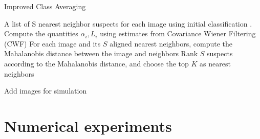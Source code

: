 \documentclass{article}
\begin{document}
\begin{algorithm}
\caption{Improved Class Averaging }
\label{alg:classav}
\begin{algorithmic}[1]
\Require  A list of S nearest neighbor suspects for each image using initial classification \cite{zhao}. 
{}
\State Compute the quantities $\alpha_i, L_i$ using estimates from Covariance Wiener Filtering (CWF) \cite{cwf}
\State For each image and its $S$ aligned nearest neighbors, compute the Mahalanobis distance between the image and neighbors
\State Rank $S$ suspects according to the Mahalanobis distance, and choose the top $K$ as nearest neighbors
\EndProcedure
{}
\EndProcedure
\end{algorithmic}
\end{algorithm}

{\color{red} Add images for simulation}
\section{Numerical experiments}
\label{sec:num}
\end{document}
